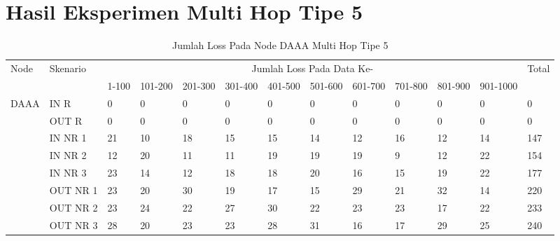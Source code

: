 \chapter{Hasil Eksperimen Multi Hop Tipe 5}
\label{lamp:G}

\begin{table}[H]
  \centering
  \caption{Jumlah Loss Pada Node DAAA Multi Hop Tipe 5}
    \begin{tabular}{|p{1cm}|p{1.9cm}|p{0.6cm}|p{0.6cm}|p{0.6cm}|p{0.6cm}|p{0.6cm}|p{0.6cm}|p{0.6cm}|p{0.6cm}|p{0.6cm}|p{0.6cm}|p{1cm}|}
    \hline
        \multirow{2}{*}{Node}&\multirow{2}{*}{Skenario}&\multicolumn{10}{|c|}{Jumlah Loss Pada Data Ke-}&\multirow{2}{*}{Total} \\\cline{3-12}
          & & 1-100 & 101-200 & 201-300 & 301-400 & 401-500 & 501-600 & 601-700 & 701-800 & 801-900 & 901-1000 & \\
        \hline
    \multirow{8}{*}{DAAA}  
    & IN R  & 0     & 0     & 0     & 0     & 0     & 0     & 0     & 0     & 0     & 0     & 0 \\
          & OUT R & 0     & 0     & 0     & 0     & 0     & 0     & 0     & 0     & 0     & 0     & 0 \\
          & IN NR 1 & 21    & 10    & 18    & 15    & 15    & 14    & 12    & 16    & 12    & 14    & 147 \\
          & IN NR 2 & 12    & 20    & 11    & 11    & 19    & 19    & 19    & 9     & 12    & 22    & 154 \\
          & IN NR 3 & 23    & 14    & 12    & 18    & 18    & 20    & 16    & 15    & 19    & 22    & 177 \\
          & OUT NR 1 & 23    & 20    & 30    & 19    & 17    & 15    & 29    & 21    & 32    & 14    & 220 \\
          & OUT NR 2 & 23    & 24    & 22    & 27    & 30    & 22    & 23    & 23    & 17    & 22    & 233 \\
          & OUT NR 3 & 28    & 20    & 23    & 23    & 28    & 31    & 16    & 17    & 29    & 25    & 240 \\
    
    \hline
    \end{tabular}%
  \label{tab:addlabel}%
\end{table}%

